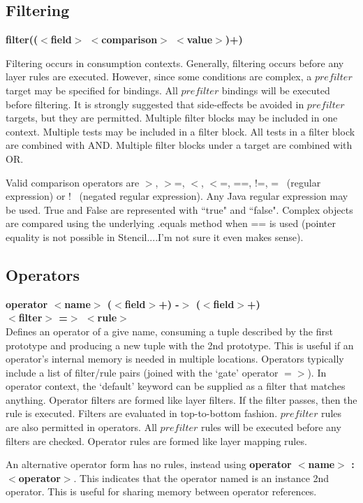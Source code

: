 \documentclass{article}
\begin{document}
\subsection{Filtering}
\textbf{filter(($<$field$>$ $<$comparison$>$ $<$value$>$)+)}

Filtering occurs in consumption contexts.  
Generally, filtering occurs before any layer rules are executed.  However,
since some conditions are complex, a $prefilter$ target may be specified for
bindings.  All $prefilter$ bindings will be executed before filtering.  It is strongly suggested
that side-effects be avoided in $prefilter$ targets, but they are permitted.
Multiple filter blocks may be included in one context.  Multiple tests may be included
 in a filter block.  All tests in a filter block are combined with AND.  Multiple filter
 blocks under a target are combined with OR.
 
Valid comparison operators are $>$, $>$=, $<$, $<$=, ==, !=, =~ (regular expression) or !~ (negated regular expression).
Any Java regular expression may be used.  True and False are represented with ``true" and ``false".
Complex objects are compared using the underlying .equals method when == is used 
(pointer equality is not possible in Stencil....I'm not sure it even makes sense).

\subsection{Operators}
\textbf{operator $<$name$>$ ($<$field$>$+) -$>$ ($<$field$>$+)}\\
\textbf{$<$filter$>$ =$>$ $<$rule$>$}\\
Defines an operator of a give name, consuming a tuple described by the first prototype and producing a new tuple with the 2nd prototype.  
This is useful if an operator's internal memory is needed in multiple locations.
Operators typically include a list of filter/rule pairs (joined with the `gate' operator $=>$).
In operator context, the `default' keyword can be supplied as a filter that matches anything.
Operator filters are formed like layer filters.  If the filter passes, then the rule is executed.  Filters are evaluated in top-to-bottom fashion.
$prefilter$ rules are also permitted in operators. All $prefilter$ rules will be executed before any filters are checked.
Operator rules are formed like layer mapping rules.

An alternative operator form has no rules, instead using \textbf{operator $<$name$>$ : $<$operator$>$}.
This indicates that the operator named is an instance 2nd operator.  
This is useful for sharing memory between operator references.
\end{document}

